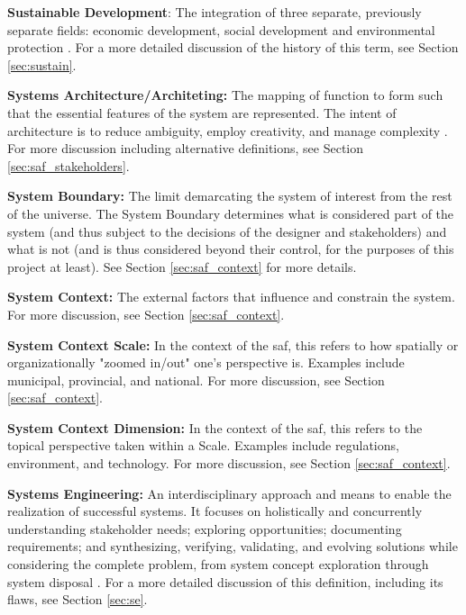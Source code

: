 \textbf{Sustainable Development}: The integration of three separate, previously separate fields: economic development, social development and environmental protection \cite{worldsummitonsustainabledevelopmentPlanImplementationWorld2002}.  For a more detailed discussion of the history of this term, see Section \ref{sec:sustain}.

\textbf{Systems Architecture/Architeting:} The mapping of function to form such that the essential features of the system are represented. The intent of architecture is to reduce ambiguity, employ creativity, and manage complexity \cite{crawleySystemArchitectureStrategy2015}. For more discussion including alternative definitions, see Section \ref{sec:saf_stakeholders}.

\textbf{System Boundary:} The limit demarcating the system of interest from the rest of the universe. The System Boundary determines what is considered part of the system (and thus subject to the decisions of the designer and stakeholders) and what is not (and is thus considered beyond their control, for the purposes of this project at least). See Section \ref{sec:saf_context} for more details.

\textbf{System Context:} The external factors that influence and constrain the system. For more discussion, see Section \ref{sec:saf_context}.

\textbf{System Context Scale:} In the context of the \ac{saf}, this refers to how spatially or organizationally "zoomed in/out" one's perspective is. Examples include municipal, provincial, and national. For more discussion, see Section \ref{sec:saf_context}.

\textbf{System Context Dimension:} In the context of the \ac{saf}, this refers to the topical perspective taken within a Scale. Examples include regulations, environment, and technology. For more discussion, see Section \ref{sec:saf_context}.

\textbf{Systems Engineering:} An interdisciplinary approach and means to enable the realization of successful systems. It focuses on holistically and concurrently understanding stakeholder needs; exploring opportunities; documenting requirements; and synthesizing, verifying, validating, and evolving solutions while considering the complete problem, from system concept exploration through system disposal \cite{systemsengineeringbodyofknowledgeSystemsEngineeringGlossary2021}. 
For a more detailed discussion of this definition, including its flaws, see Section \ref{sec:se}.

